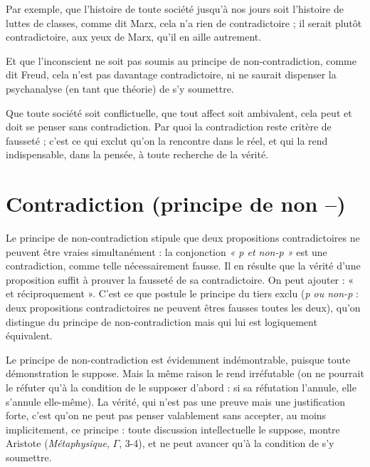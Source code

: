 Par exemple, que l’histoire de toute société jusqu’à nos jours soit l’histoire
de luttes de classes, comme dit Marx, cela n’a rien de contradictoire ; il serait
plutôt contradictoire, aux yeux de Marx, qu’il en aille autrement.

Et que l'inconscient ne soit pas soumis au principe de non-contradiction,
comme dit Freud, cela n’est pas davantage contradictoire, ni ne saurait dispenser
la psychanalyse (en tant que théorie) de s’y soumettre.

Que toute société soit conflictuelle, que tout affect soit ambivalent, cela
peut et doit se penser sans contradiction. Par quoi la contradiction reste critère
de fausseté ; c’est ce qui exclut qu’on la rencontre dans le réel, et qui la rend
indispensable, dans la pensée, à toute recherche de la vérité.

\section{Contradiction (principe de non {\bf --})}
Le principe de non-contradiction stipule que
deux propositions contradictoires ne peuvent être vraies simultanément : la conjonction
{\it « p et non-p »} est une contradiction, comme telle nécessairement fausse. Il en
résulte que la vérité d’une proposition suffit à prouver la fausseté de sa contradictoire.
On peut ajouter : « et réciproquement ». C’est ce que postule le principe
du tiers exclu ({\it p ou non-p} : deux propositions contradictoires ne peuvent
êtres fausses toutes les deux), qu’on distingue du principe de non-contradiction
mais qui lui est logiquement équivalent.

Le principe de non-contradiction est évidemment indémontrable, puisque
toute démonstration le suppose. Mais la même raison le rend irréfutable (on ne
pourrait le réfuter qu’à la condition de le supposer d’abord : si sa réfutation
l'annule, elle s’annule elle-même). La vérité, qui n’est pas une preuve mais une
justification forte, c’est qu’on ne peut pas penser valablement sans accepter, au
moins implicitement, ce principe : toute discussion intellectuelle le suppose,
montre Aristote ({\it Métaphysique}, $\Gamma$, 3-4), et ne peut avancer qu’à la condition de
s’y soumettre.

